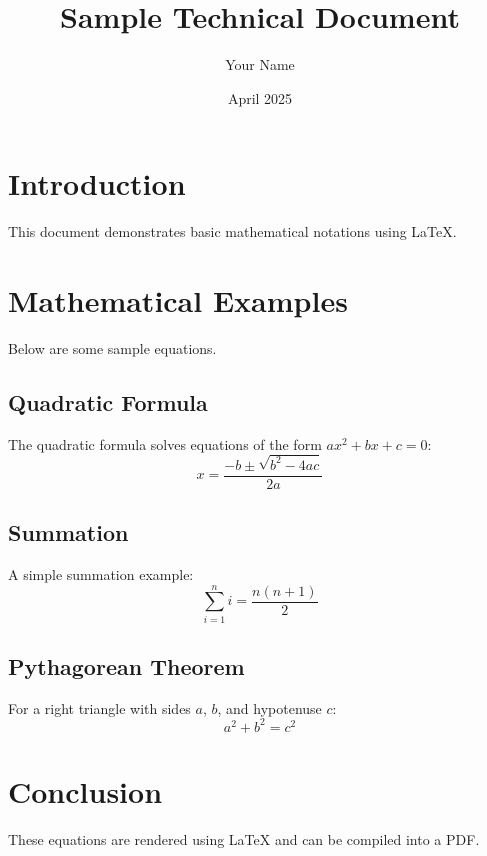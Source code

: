 \documentclass{article}
\title{Sample Technical Document}
\author{Your Name}
\date{April 2025}
\begin{document}
\maketitle

\section{Introduction}
This document demonstrates basic mathematical notations using LaTeX.

\section{Mathematical Examples}
Below are some sample equations.

\subsection{Quadratic Formula}
The quadratic formula solves equations of the form $ax^2 + bx + c = 0$:
\begin{equation}
x = \frac{-b \pm \sqrt{b^2 - 4ac}}{2a}
\end{equation}

\subsection{Summation}
A simple summation example:
\begin{equation}
\sum_{i=1}^{n} i = \frac{n(n+1)}{2}
\end{equation}

\subsection{Pythagorean Theorem}
For a right triangle with sides $a$, $b$, and hypotenuse $c$:
\begin{equation}
a^2 + b^2 = c^2
\end{equation}

\section{Conclusion}
These equations are rendered using LaTeX and can be compiled into a PDF.
\end{document}
